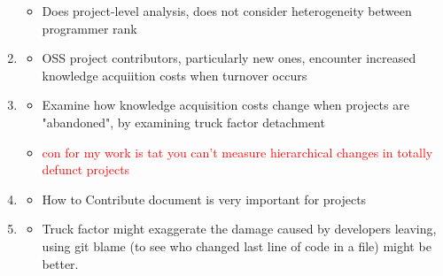 \documentclass[12pt,notitlepage]{article}
\begin{document}
\begin{enumerate}
\begin{itemize}
        \item Does project-level analysis, does not consider heterogeneity between programmer rank 
    \end{itemize}
    \item \cite{rashid_exploring_2017} 
    \begin{itemize}
        \item OSS project contributors, particularly new ones, encounter increased knowledge acquiition costs when turnover occurs 
    \end{itemize}
    \item \cite{avelino_abandonment_2019}
    \begin{itemize}
        \item Examine how knowledge acquisition costs change when projects are "abandoned", by examining truck factor detachment
        \item \textcolor{red}{con for my work is tat you can't measure hierarchical changes in totally defunct projects}
    \end{itemize}
    \item \cite{hata_characteristics_2015}
    \begin{itemize}
        \item How to Contribute document is very important for projects
    \end{itemize}
    \item \cite{rigby_quantifying_2016}
    \begin{itemize}
        \item Truck factor might exaggerate the damage caused by developers leaving, using git blame (to see who changed last line of code in a file) might be better. 
    \end{itemize}
\end{enumerate}
\end{document}
